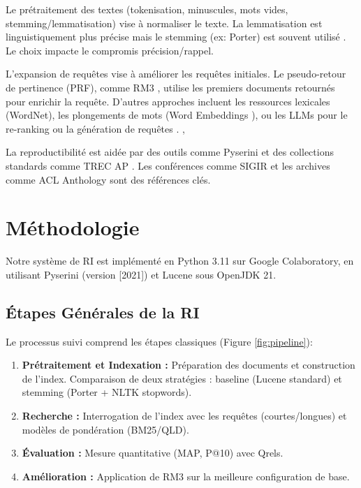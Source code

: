 \documentclass[11pt,a4paper]{article}
\begin{document}
Le prétraitement des textes (tokenisation, minuscules, mots vides, stemming/lemmatisation) vise à normaliser le texte. La lemmatisation est linguistiquement plus précise mais le stemming (ex: Porter) est souvent utilisé \citep{Manning2008IRBook}. Le choix impacte le compromis précision/rappel. %

L'expansion de requêtes vise à améliorer les requêtes initiales. Le pseudo-retour de pertinence (PRF), comme RM3 \citep{AbdulJaleel2004PRF}, utilise les premiers documents retournés pour enrichir la requête. D'autres approches incluent les ressources lexicales (WordNet\citep{Miller1995WordNet}), les plongements de mots (Word Embeddings \citep{Mikolov2013WordEmbeddings}), ou les LLMs pour le re-ranking \citep{Nogueira2019BERTReRank} ou la génération de requêtes \citep{Ma2023QueryGenerationLLM}. \citep{Devlin2019BERT}, \citep{stanfordCS224n}

La reproductibilité est aidée par des outils comme Pyserini \citep{Lin2021Pyserini} et des collections standards comme TREC AP \citep{Harman1995TREC}. Les conférences comme SIGIR \citep{sigirWebsite} et les archives comme ACL Anthology \citep{aclAnthologyWebsite} sont des références clés.

\section{Méthodologie}
\label{sec:methodo}
Notre système de RI est implémenté en Python 3.11 sur Google Colaboratory, en utilisant Pyserini (version [2021]) et Lucene sous OpenJDK 21.

\subsection{Étapes Générales de la RI}
Le processus suivi comprend les étapes classiques (Figure \ref{fig:pipeline}):
\begin{enumerate}
    \item \textbf{Prétraitement et Indexation :} Préparation des documents et construction de l'index. Comparaison de deux stratégies : baseline (Lucene standard) et stemming (Porter + NLTK stopwords).
    \item \textbf{Recherche :} Interrogation de l'index avec les requêtes (courtes/longues) et modèles de pondération (BM25/QLD).
    \item \textbf{Évaluation :} Mesure quantitative (MAP, P@10) avec Qrels.
    \item \textbf{Amélioration :} Application de RM3 sur la meilleure configuration de base.
\end{enumerate}
\end{document}
